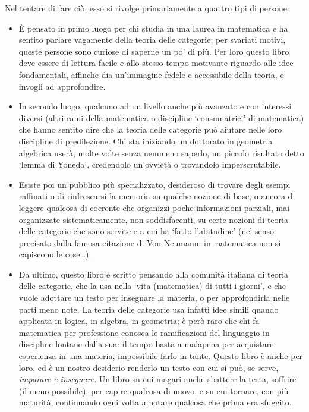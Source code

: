 Nel tentare di fare ciò, esso si rivolge primariamente a quattro tipi di persone:
\begin{itemize}
 \item È pensato in primo luogo per chi studia in una laurea in matematica e ha sentito parlare vagamente della teoria delle categorie; per svariati motivi, queste persone sono curiose di saperne un po' di più. Per loro questo libro deve essere di lettura facile e allo stesso tempo motivante riguardo alle idee fondamentali, affinche dia un'immagine fedele e accessibile della teoria, e invogli ad approfondire.
 \item In secondo luogo, qualcuno ad un livello anche più avanzato e con interessi diversi (altri rami della matematica o discipline `consumatrici' di matematica) che hanno sentito dire che la teoria delle categorie può aiutare nelle loro discipline di predilezione. Chi sta iniziando un dottorato in geometria algebrica userà, molte volte senza nemmeno saperlo, un piccolo risultato detto `lemma di Yoneda', credendolo un'ovvietà o trovandolo imperscrutabile.
 \item Esiste poi un pubblico più specializzato, desideroso di trovare degli esempi raffinati o di rinfrescarsi la memoria su qualche nozione di base, o ancora di leggere qualcosa di coerente che organizzi poche informazioni parziali, mai organizzate sistematicamente, non soddisfacenti, su certe nozioni di teoria delle categorie che sono servite e a cui ha `fatto l'abitudine' (nel senso precisato dalla famosa citazione di Von Neumann: in matematica non si capiscono le cose\dots).
 \item Da ultimo, questo libro è scritto pensando alla comunità italiana di teoria delle categorie, che la usa nella `vita (matematica) di tutti i giorni', e che vuole adottare un testo per insegnare la materia, o per approfondirla nelle parti meno note. La teoria delle categorie usa infatti idee simili quando applicata in logica, in algebra, in geometria; è però raro che chi fa matematica per professione conosca le ramificazioni del linguaggio in discipline lontane dalla sua: il tempo basta a malapena per acquistare esperienza in una materia, impossibile farlo in tante. Questo libro è anche per loro, ed è un nostro desiderio renderlo un testo con cui si può, se serve, \emph{imparare e insegnare}. Un libro su cui magari anche sbattere la testa, soffrire (il meno possibile), per capire qualcosa di nuovo, e su cui tornare, con più maturità, continuando ogni volta a notare qualcosa che prima era sfuggito.
\end{itemize}
\Todo{}

